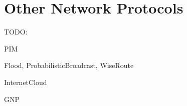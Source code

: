\chapter{Other Network Protocols}
\label{cha:other-network-protocols}

TODO: 

PIM

Flood, ProbabilisticBroadcast, WiseRoute

InternetCloud

GNP


